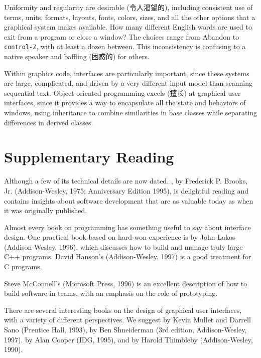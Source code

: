 Uniformity and regularity are desirable (令人渴望的), including consistent
use of terms, units, formats, layouts, fonts, colors, sizes, and all the
other options that a graphical system makes available. How many different
English words are used to exit from a program or close a window? The
choices range from Abandon to \verb'control-Z', with at least a dozen
between. This inconsistency is confusing to a native speaker and baffling
(困惑的) for others.

Within graphics code, interfaces are particularly important, since these
systems are large, complicated, and driven by a very different input model
than scanning sequential text. Object-oriented programming excels (擅长) at
graphical user interfaces, since it provides a way to encapsulate all the
state and behaviors of windows, using inheritance to combine similarities
in base classes while separating differences in derived classes.

\section*{Supplementary Reading}

Although a few of its technical details are now dated. , by Frederick P. Brooks, Jr. (Addison-Wesley, 1975;
Anniversary Edition 1995), is delightful reading and contains insights
about software development that are as valuable today as when it was
originally published.

Almost every book on programming has something useful to say about
interface design. One practical book based on hard-won experience is
 by John Lakos (Addison-Wesley,
1996), which discusses how to build and manage truly large C++ programs.
David Hanson's 
(Addison-Wesley. 1997) is a good treatment for C programs.

Steve McConnell's  (Microsoft Press, 1996) is
an excellent description of how to build software in teams, with an
emphasis on the role of prototyping.

There are several interesting books on the design of graphical user
interfaces, with a variety of different perspectives. We suggest
by Kevin Mullet and Darrell Sano (Prentice Hall, 1993),  by
Ben Shneiderman (3rd edition, Addison-Wesley, 1997).  by Alan Cooper (IDG, 1995),
and  by Harold Thimbleby (Addison-Wesley,
1990).
